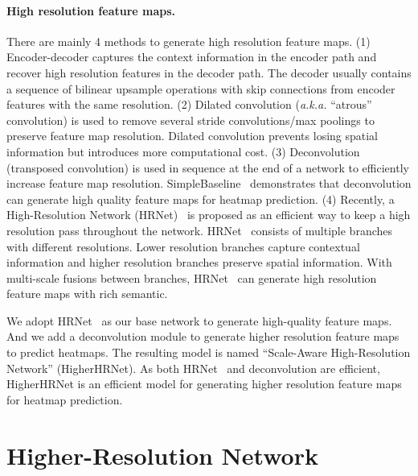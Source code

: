 \documentclass[10pt,twocolumn,letterpaper]{article}
\begin{document}
\paragraph{High resolution feature maps.} There are mainly 4 methods to generate high resolution feature maps. (1) Encoder-decoder \cite{newell2016stacked,he2017mask,chen2018cascaded,ronneberger2015u,badrinarayanan2017segnet,lin2017refinenet,wojna2017devil,cheng2019spgnet} captures the context information in the encoder path and recover high resolution features in the decoder path. The decoder usually contains a sequence of bilinear upsample operations with skip connections from encoder features with the same resolution. (2) Dilated convolution \cite{yu2015multi,deeplabv12015,chen2018deeplabv2,chen2017deeplabv3,deeplabv3plus2018,dpc2018,liu2019auto,yang2019deeperlab,cheng2019panoptic,cheng2020panoptic} (\emph{a.k.a.} ``atrous'' convolution) is used to remove several stride convolutions/max poolings to preserve feature map resolution. Dilated convolution prevents losing spatial information but introduces more computational cost. (3) Deconvolution (transposed convolution) \cite{xiao2018simple} is used in sequence at the end of a network to efficiently increase feature map resolution. SimpleBaseline~\cite{xiao2018simple} demonstrates that deconvolution can generate high quality feature maps for heatmap prediction. (4) Recently, a High-Resolution Network (HRNet)~\cite{sun2019deep, WangSCJDZLMTWLX19} is proposed as an efficient way to keep a high resolution pass throughout the network. HRNet~\cite{sun2019deep,WangSCJDZLMTWLX19} consists of multiple branches with different resolutions. Lower resolution branches capture contextual information and higher resolution branches preserve spatial information. With multi-scale fusions between branches, HRNet~\cite{sun2019deep,WangSCJDZLMTWLX19} can generate high resolution feature maps with rich semantic.

We adopt HRNet~\cite{sun2019deep,WangSCJDZLMTWLX19} as our base network to generate high-quality feature maps. And we add a deconvolution module to generate higher resolution feature maps to predict heatmaps.
The resulting model is named ``Scale-Aware High-Resolution Network'' (HigherHRNet). As both HRNet~\cite{sun2019deep,WangSCJDZLMTWLX19,WangSCJDZLMTWLX19} and deconvolution are efficient, HigherHRNet is an efficient model for generating higher resolution feature maps for heatmap prediction.

\section{Higher-Resolution Network}
\label{sec:approach}
\end{document}
